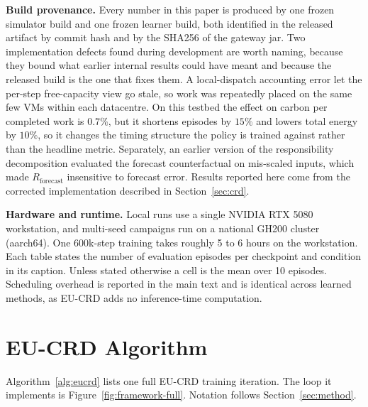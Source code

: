\documentclass{article} %
\begin{document}
\textbf{Build provenance.} Every number in this paper is produced by one frozen simulator build and one frozen learner build, both identified in the released artifact by commit hash and by the SHA256 of the gateway jar. Two implementation defects found during development are worth naming, because they bound what earlier internal results could have meant and because the released build is the one that fixes them. A local-dispatch accounting error let the per-step free-capacity view go stale, so work was repeatedly placed on the same few VMs within each datacentre. On this testbed the effect on carbon per completed work is $0.7\%$, but it shortens episodes by $15\%$ and lowers total energy by $10\%$, so it changes the timing structure the policy is trained against rather than the headline metric. Separately, an earlier version of the responsibility decomposition evaluated the forecast counterfactual on mis-scaled inputs, which made $R_{\text{forecast}}$ insensitive to forecast error. Results reported here come from the corrected implementation described in Section~\ref{sec:crd}.

\textbf{Hardware and runtime.} Local runs use a single NVIDIA RTX 5080 workstation, and multi-seed campaigns run on a national GH200 cluster (aarch64). One 600k-step training takes roughly 5 to 6 hours on the workstation. Each table states the number of evaluation episodes per checkpoint and condition in its caption. Unless stated otherwise a cell is the mean over 10 episodes. Scheduling overhead is reported in the main text and is identical across learned methods, as EU-CRD adds no inference-time computation.

\section{EU-CRD Algorithm}\label{app:algorithm}

Algorithm~\ref{alg:eucrd} lists one full EU-CRD training iteration. The loop it implements is Figure~\ref{fig:framework-full}. Notation follows Section~\ref{sec:method}.
\end{document}
